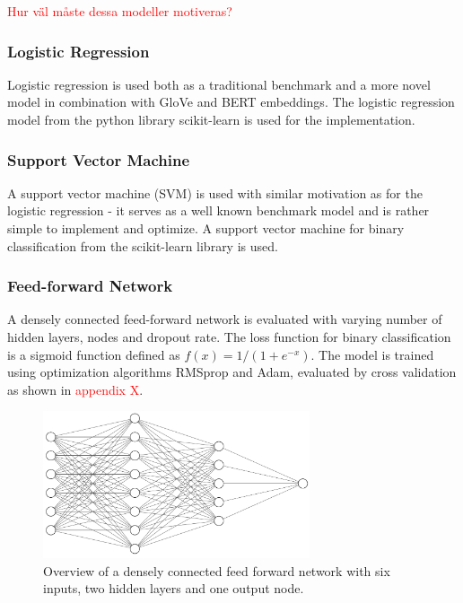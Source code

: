 \textcolor{red}{Hur väl måste dessa modeller motiveras?}

\subsubsection*{Logistic Regression}

Logistic regression is used both as a traditional benchmark and a more novel model in combination with GloVe and BERT embeddings. The logistic regression model from the python library scikit-learn is used for the implementation.

\subsubsection*{Support Vector Machine}

A support vector machine (SVM) is used with similar motivation as for the logistic regression - it serves as a well known benchmark model and is rather simple to implement and optimize.  A support vector machine for binary classification from the scikit-learn library is used. 

\subsubsection*{Feed-forward Network}

A densely connected feed-forward network is evaluated with varying number of hidden layers, nodes and dropout rate. The loss function for binary classification is a sigmoid function defined as $f(x) = 1/(1+e^{-x})$. The model is trained using optimization algorithms RMSprop and Adam, evaluated by cross validation as shown in \textcolor{red}{appendix X}.

\begin{figure}[H]
    \centering
    \includegraphics[width=0.7\textwidth]{Figures/ff.PNG}
    \caption{Overview of a densely connected feed forward network with six inputs, two hidden layers and one output node.}
\end{figure}

